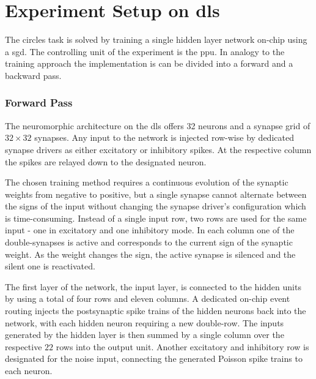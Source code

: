


\section{Experiment Setup on \gls{dls}}
\label{circlesimplementation}
The circles task is solved by training a single hidden layer network on-chip using a \acrlong{sgd}. The controlling unit of the experiment is the \gls{ppu}. In analogy to the training approach the implementation is can be divided into a forward and a backward pass. %

\subsubsection*{Forward Pass}

The neuromorphic architecture on the \gls{dls} offers 32 neurons and a synapse grid of $32 \times 32$ synapses. Any input to the network is injected row-wise by dedicated synapse drivers as either excitatory or inhibitory spikes. At the respective column the spikes are relayed down to the designated neuron. 

The chosen training method requires a continuous evolution of the synaptic weights from negative to positive, but a single synapse cannot alternate between the signs of the input without changing the synapse driver's configuration which is time-consuming. Instead of a single input row, two rows are used for the same input - one in excitatory and one inhibitory mode. In each column one of the double-synapses is active and corresponds to the current sign of the synaptic weight. As the weight changes the sign, the active synapse is silenced and the silent one is reactivated. 

The first layer of the network, the input layer, is connected to the hidden units by using a total of four rows and eleven columns. A dedicated on-chip event routing injects the postsynaptic spike trains of the hidden neurons back into the network, with each hidden neuron requiring a new double-row. The inputs generated by the hidden layer is then summed by a single column over the respective $22$ rows into the output unit. Another excitatory and inhibitory row is designated for the noise input, connecting the generated Poisson spike trains to each neuron.

